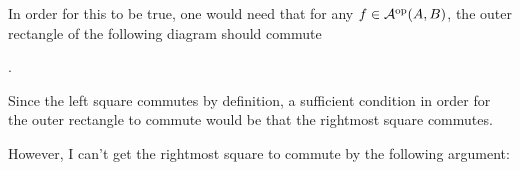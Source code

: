 \documentclass[a4paper, 12pt]{article}
\begin{document}
In order for this to be true, one would need that for any \( f \in {\mathcal{A}}^{\operatorname{op}}(A, B) \), the outer rectangle of the following diagram should commute
\begin{center}
    .
\end{center}

Since the left square commutes by definition, a sufficient condition in order for the outer rectangle to commute would be that the rightmost square commutes.

However, I can't get the rightmost square to commute by the following argument:
\end{document}
